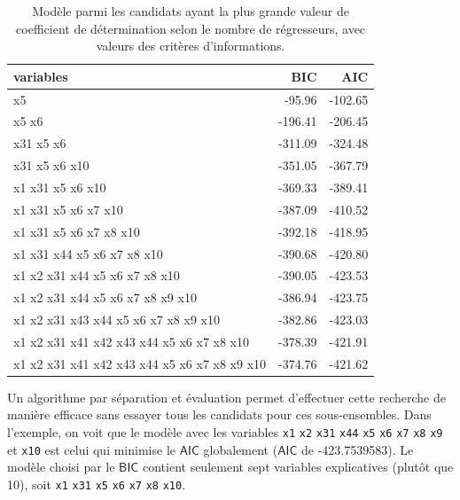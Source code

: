 \documentclass[
  11pt,
  letterpaper,
]{scrbook}
\theoremstyle{definition}
\theoremstyle{remark}
\begin{document}
\begin{longtable}[t]{lrr}

\caption{\label{tbl-leaps-simple}Modèle parmi les candidats ayant la
plus grande valeur de coefficient de détermination selon le nombre de
régresseurs, avec valeurs des critères d'informations.}

\tabularnewline

\toprule
variables & BIC & AIC\\
\midrule
x5 & -95.96 & -102.65\\
x5 x6 & -196.41 & -206.45\\
x31 x5 x6 & -311.09 & -324.48\\
x31 x5 x6 x10 & -351.05 & -367.79\\
x1 x31 x5 x6 x10 & -369.33 & -389.41\\
\addlinespace
x1 x31 x5 x6 x7 x10 & -387.09 & -410.52\\
x1 x31 x5 x6 x7 x8 x10 & -392.18 & -418.95\\
x1 x31 x44 x5 x6 x7 x8 x10 & -390.68 & -420.80\\
x1 x2 x31 x44 x5 x6 x7 x8 x10 & -390.05 & -423.53\\
x1 x2 x31 x44 x5 x6 x7 x8 x9 x10 & -386.94 & -423.75\\
\addlinespace
x1 x2 x31 x43 x44 x5 x6 x7 x8 x9 x10 & -382.86 & -423.03\\
x1 x2 x31 x41 x42 x43 x44 x5 x6 x7 x8 x10 & -378.39 & -421.91\\
x1 x2 x31 x41 x42 x43 x44 x5 x6 x7 x8 x9 x10 & -374.76 & -421.62\\
\bottomrule

\end{longtable}

Un algorithme par séparation et évaluation permet d'effectuer cette
recherche de manière efficace sans essayer tous les candidats pour ces
sous-ensembles. Dans l'exemple, on voit que le modèle avec les variables
\texttt{x1} \texttt{x2} \texttt{x31} \texttt{x44} \texttt{x5}
\texttt{x6} \texttt{x7} \texttt{x8} \texttt{x9} et \texttt{x10} est
celui qui minimise le \(\mathsf{AIC}\) globalement (\(\mathsf{AIC}\) de
-423.7539583). Le modèle choisi par le \(\mathsf{BIC}\) contient
seulement sept variables explicatives (plutôt que 10), soit \texttt{x1}
\texttt{x31} \texttt{x5} \texttt{x6} \texttt{x7} \texttt{x8}
\texttt{x10}.
\end{document}
